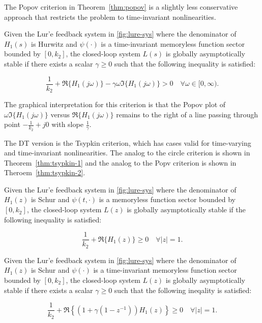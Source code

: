 The Popov criterion in Theorem~\ref{thm:popov} is a slightly less conservative approach that restricts the problem to time-invariant nonlinearities. 

\begin{thm} \label{thm:popov}
	Given the Lur'e feedback system in \autoref{fig:lure-sys} where the denominator of $H_1(s)$ is Hurwitz and $\psi(\cdot)$ is a time-invariant memoryless function sector bounded by $[0, k_2]$, the closed-loop system $L(s)$  is globally asymptotically stable if there exists a scalar $\gamma \geq 0$ such that the following inequality is satisfied:
	
	\begin{equation}
		\frac{1}{k_2} + \Re\{H_1(j\omega)\} - \gamma\omega\Im\{H_1(j\omega)\} > 0 \quad \forall \omega \in [0, \infty).
	\end{equation}
\end{thm}

The graphical interpretation for this criterion is that the Popov plot of $\omega\Im\{H_1(j\omega)\}$ versus $\Re\{H_1(j\omega)\}$ remains to the right of a line passing through point $-\frac{1}{k_2} + j0$ with slope $\frac{1}{\gamma}$. 

The \gls{DT} version is the Tsypkin criterion, which has cases valid for time-varying and time-invariant nonlinearities. The analog to the circle criterion is shown in Theorem~\ref{thm:tsypkin-1} and the analog to the Popv criterion is shown in Theroem~\ref{thm:tsypkin-2}.

\begin{thm} \label{thm:tsypkin-1}
	Given the Lur'e feedback system in \autoref{fig:lure-sys} where the denominator of $H_1(z)$ is Schur and $\psi(t,\cdot)$ is a memoryless function sector bounded by $[0, k_2]$, the closed-loop system $L(z)$  is globally asymptotically stable if the following inequality is satisfied:
	
	\begin{equation}
		\frac{1}{k_2} + \Re\{H_1(z)\}\geq 0 \quad \forall |z| = 1.
	\end{equation}
\end{thm}

\begin{thm} \label{thm:tsypkin-2}
	Given the Lur'e feedback system in \autoref{fig:lure-sys} where the denominator of $H_1(z)$ is Schur and $\psi(\cdot)$ is a time-invariant memoryless function sector bounded by $[0, k_2]$, the closed-loop system $L(z)$  is globally asymptotically stable if there exists a scalar $\gamma \geq 0$ such that the following ineqality is satisfied:
	
	\begin{equation}
		\frac{1}{k_2} + \Re\left\{\left(1 + \gamma\left(1 - z^{-1}\right)\right)H_1(z)\right\}\geq 0 \quad \forall |z| = 1.
	\end{equation}
\end{thm}

